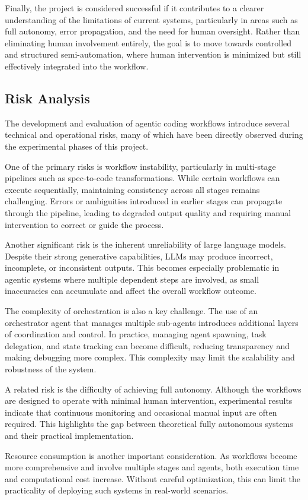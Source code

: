 \documentclass[a4paper,12pt]{report}
\begin{document}
Finally, the project is considered successful if it contributes to a clearer understanding of the limitations of current systems, particularly in areas such as full autonomy, error propagation, and the need for human oversight. Rather than eliminating human involvement entirely, the goal is to move towards controlled and structured semi-automation, where human intervention is minimized but still effectively integrated into the workflow.
\subsection{Risk Analysis}
The development and evaluation of agentic coding workflows introduce several technical and operational risks, many of which have been directly observed during the experimental phases of this project.

One of the primary risks is workflow instability, particularly in multi-stage pipelines such as spec-to-code transformations. While certain workflows can execute sequentially, maintaining consistency across all stages remains challenging. Errors or ambiguities introduced in earlier stages can propagate through the pipeline, leading to degraded output quality and requiring manual intervention to correct or guide the process.

Another significant risk is the inherent unreliability of large language models. Despite their strong generative capabilities, LLMs may produce incorrect, incomplete, or inconsistent outputs. This becomes especially problematic in agentic systems where multiple dependent steps are involved, as small inaccuracies can accumulate and affect the overall workflow outcome.

The complexity of orchestration is also a key challenge. The use of an orchestrator agent that manages multiple sub-agents introduces additional layers of coordination and control. In practice, managing agent spawning, task delegation, and state tracking can become difficult, reducing transparency and making debugging more complex. This complexity may limit the scalability and robustness of the system.

A related risk is the difficulty of achieving full autonomy. Although the workflows are designed to operate with minimal human intervention, experimental results indicate that continuous monitoring and occasional manual input are often required. This highlights the gap between theoretical fully autonomous systems and their practical implementation.

Resource consumption is another important consideration. As workflows become more comprehensive and involve multiple stages and agents, both execution time and computational cost increase. Without careful optimization, this can limit the practicality of deploying such systems in real-world scenarios.
\end{document}
